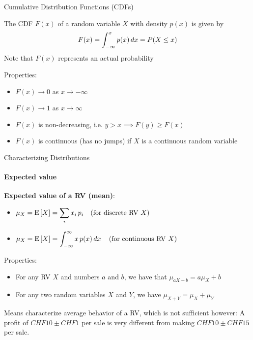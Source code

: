 {    \begin{frame}{Cumulative Distribution Functions (CDFs)}
        \begin{boxed}
            The CDF $F(x)$ of a random variable $X$ with density $p(x)$ is given by
            $$F(x) = \int _ {-\infty}^{x} p(x) \mathop{dx} = P(X \le x)$$
            Note that $F(x)$ represents an actual probability
        \end{boxed}

        Properties:
        \begin{itemize}
            \item $F(x) \rightarrow 0$ as $x\rightarrow -\infty$
            \item $F(x) \rightarrow 1$ as $x\rightarrow \infty$
            \item $F(x)$ is non-decreasing, i.e. $y > x \implies F(y) \ge F(x)$
            \item $F(x)$ is continuous (has no jumps) if $X$ is a continuous random variable
        \end{itemize}
    \end{frame}

    \begin{frame}{Characterizing Distributions}
        \framesubtitle{Expected value}
        \begin{boxed}
            \textbf{Expected value of a RV (mean)}:
            \begin{itemize}
                \item $\displaystyle \mu_X = \operatorname{E}\left[X\right] = \sum_i x_i\,p_i \quad \text{(for discrete RV $X$)}$
                \item $\displaystyle \mu_X = \operatorname{E}\left[X\right] = \int_{-\infty}^\infty x\,p(x) \mathop{dx} \quad \text{(for continuous RV $X$)}$
            \end{itemize}
        \end{boxed}

        Properties:
        \begin{itemize}
            \item For any RV $X$ and numbers $a$ and $b$, we have that $\mu_{aX+b} = a\mu_X + b$
            \item For any two random variables $X$ and $Y$, we have $\mu_{X+Y} = \mu_X+\mu_Y$
        \end{itemize}

        Means characterize average behavior of a RV, which is not sufficient however:
        A profit of $CHF 10 \pm CHF 1$ per sale is very different from making $CHF 10 \pm CHF 15$ per sale.
    \end{frame}

}
